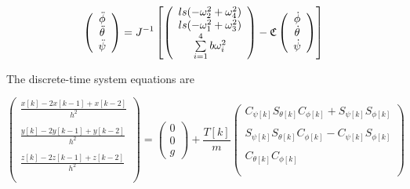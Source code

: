 \begin{equation}
    \left(
        \begin{array}{c}
           \ddot{\phi}\\
           \ddot{\theta}\\
           \ddot{\psi}\\
        \end{array}
    \right) = J^{-1}
    \left[ \left(
        \begin{array}{c}
            l s (-\omega_2^2 + \omega_4^2)\\
            l s (-\omega_1^2 + \omega_3^2)\\
            \sum \limits_{i=1}^4 b \omega_i^2\\
        \end{array}
    \right) -
    \mathfrak{C}
    \left(
        \begin{array}{c}
           \dot{\phi}\\
           \dot{\theta}\\
           \dot{\psi}\\
        \end{array}
    \right)
    \right]
\end{equation}

The discrete-time system equations are

\begin{equation}
    \left(
        \begin{array}{c}
           \frac{x[k] -2 x[k-1] + x[k-2]}{h^2} \\\\
           \frac{y[k] -2 y[k-1] + y[k-2]}{h^2} \\\\
           \frac{z[k] -2 z[k-1] + z[k-2]}{h^2}\\\\
        \end{array}
    \right)
    = \left(
       \begin{array}{c}
        0\\
        0\\
        g
      \end{array}
    \right)
    +\frac{T[k]}{m}
     \left(
        \begin{array}{c}
             C_{\psi[k]}S_{\theta[k]}C_{\phi[k]} + S_{\psi[k]}S_{\phi[k]} \\\\
             S_{\psi[k]}S_{\theta[k]}C_{\phi[k]} - C_{\psi[k]}S_{\phi[k]} \\\\
             C_{\theta[k]} C_{\phi[k]} \\\\
        \end{array}
    \right)
\end{equation}


